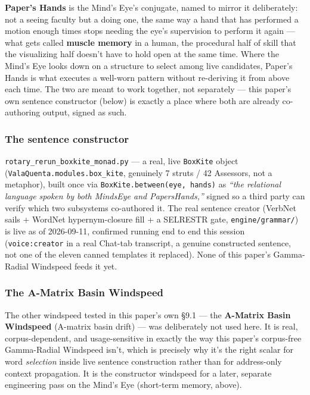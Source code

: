 \documentclass[
  10pt,
]{article}
\begin{document}
\textbf{Paper's Hands} is the Mind's Eye's conjugate, named to mirror it
deliberately: not a seeing faculty but a doing one, the same way a hand
that has performed a motion enough times stops needing the eye's
supervision to perform it again --- what gets called \textbf{muscle
memory} in a human, the procedural half of skill that the visualizing
half doesn't have to hold open at the same time. Where the Mind's Eye
looks down on a structure to select among live candidates, Paper's Hands
is what executes a well-worn pattern without re-deriving it from above
each time. The two are meant to work together, not separately --- this
paper's own sentence constructor (below) is exactly a place where both
are already co-authoring output, signed as such.

\hypertarget{the-sentence-constructor}{%
\subsubsection{The sentence
constructor}\label{the-sentence-constructor}}

\texttt{rotary\_rerun\_boxkite\_monad.py} --- a real, live
\texttt{BoxKite} object (\texttt{ValaQuenta.modules.box\_kite},
genuinely 7 struts / 42 Assessors, not a metaphor), built once via
\texttt{BoxKite.between(eye,\ hands)} as \emph{``the relational language
spoken by both MindsEye and PapersHands,''} signed so a third party can
verify which two subsystems co-authored it. The real sentence creator
(VerbNet sails + WordNet hypernym-closure fill + a SELRESTR gate,
\texttt{engine/grammar/}) is live as of 2026-09-11, confirmed running
end to end this session (\texttt{voice:creator} in a real Chat-tab
transcript, a genuine constructed sentence, not one of the eleven canned
templates it replaced). None of this paper's Gamma-Radial Windspeed
feeds it yet.

\hypertarget{the-a-matrix-basin-windspeed}{%
\subsubsection{The A-Matrix Basin
Windspeed}\label{the-a-matrix-basin-windspeed}}

The other windspeed tested in this paper's own §9.1 --- the
\textbf{A-Matrix Basin Windspeed} (A-matrix basin drift) --- was
deliberately not used here. It is real, corpus-dependent, and
usage-sensitive in exactly the way this paper's corpus-free Gamma-Radial
Windspeed isn't, which is precisely why it's the right scalar for word
\emph{selection} inside live sentence construction rather than for
address-only context propagation. It is the constructor windspeed for a
later, separate engineering pass on the Mind's Eye (short-term memory,
above).
\end{document}
